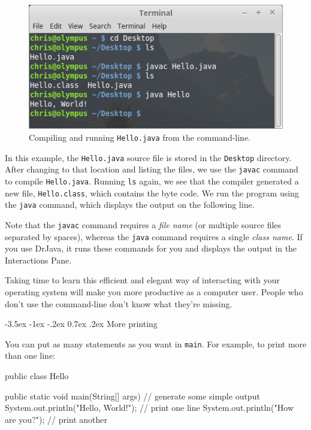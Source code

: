 \documentclass[12pt]{book}
\makeatletter
\renewcommand{\section}{\@startsection {section}{1}{\z@}%
    {-3.5ex \@plus -1ex \@minus -.2ex}%
    {0.7ex \@plus.2ex}%
    {\normalfont\Large\bfseries}}
\theoremstyle{exercise}
\newcommand{\java}[1]{\lstinline{#1}} %
\makeatother
\begin{document}

\begin{figure}[!h]
\begin{center}
\includegraphics[width=4.5in]{figs/terminal.png}
\caption{Compiling and running {\tt Hello.java} from the command-line.}
\end{center}
\end{figure}

In this example, the {\tt Hello.java} source file is stored in the {\tt Desktop} directory.
After changing to that location and listing the files, we use the {\tt javac} command to compile {\tt Hello.java}.
Running {\tt ls} again, we see that the compiler generated a new file, {\tt Hello.class}, which contains the byte code.
We run the program using the {\tt java} command, which displays the output on the following line.

Note that the {\tt javac} command requires a {\em file name} (or multiple source files separated by spaces), whereas the {\tt java} command requires a single {\em class name}.
If you use DrJava, it runs these commands for you and displays the output in the Interactions Pane.

Taking time to learn this efficient and elegant way of interacting with your operating system will make you more productive as a computer user.
People who don't use the command-line don't know what they're missing.



\section{More printing}

You can put as many statements as you want in \java{main}.
For example, to print more than one line:

\begin{code}
public class Hello {

    public static void main(String[] args) {
        // generate some simple output
        System.out.println("Hello, World!");  // print one line
        System.out.println("How are you?");   // print another
    }

}
\end{code}
\end{document}

